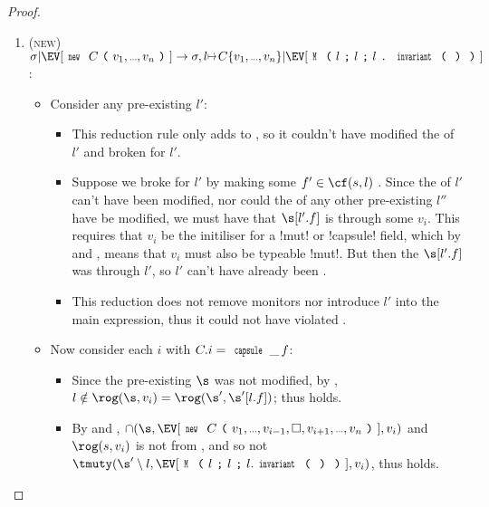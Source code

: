\begin{proof}
\begin{enumerate}
\item (\textsc{new}) $\sigma|\EV[\Kw{new}\ C\oR v_1,\ldots,v_n\cR]\rightarrow \sigma,l\mapsto C\{v_1,\ldots,v_n\}| \EV[\M{l}{l}{l\singleDot\invariant}]$:
\begin{itemize}
	\item Consider any pre-existing $l'$:
	\begin{itemize}
		\item This reduction rule only adds to \s, so it couldn't have modified the \rog of $l'$ and broken \CNC for $l'$.
		\item Suppose we broke \CNE for $l'$ by making some $f' \in \cf(s, l)$ \tmuty. Since the \rog of $l'$ can't have been modified, nor could the \rog of any other pre-existing $l''$ have be modified, we must have that $\s[l'.f]$ is \tmuty through some $v_i$. This requires that $v_i$ be the initiliser for a \Q!mut! or \Q!capsule! field, which by  and , means that $v_i$ must also be typeable \Q!mut!. But then the $\s[l'.f]$ was \tmuty through $l'$, so $l'$ can't have already been \CNE.
		\item This reduction does not remove monitors nor introduce $l'$ into the main expression, thus it could not have violated \CNO.
	\end{itemize}
	\item Now consider each $i$ with $C.i = \Kw{capsule}\,\_\,f$:
	\begin{itemize}
	\item Since the pre-existing $\s$ was not modified, by \VS, $l \notin \rog(\s, v_i) = \rog(\s', \s'[l.f])$; thus \CNC holds.
	\item By  and , $\cap(\s, \EV[\Kw{new}\ C\oR v_1,\ldots,v_{i-1},\square,v_{i+1},\ldots,v_n\cR], v_i)$ and $\rog(s, v_i)$ is not \tmuty from \EV, and so not $\tmuty(\s'\setminus l, \EV[\M{l}{l}{l.\invariant}], v_i)$, thus \CNE holds.
	\end{itemize}
\end{itemize}



\end{enumerate}
\end{proof}
